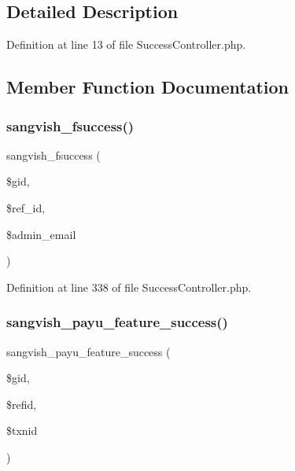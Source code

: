\subsection{Detailed Description}


Definition at line 13 of file Success\+Controller.\+php.



\subsection{Member Function Documentation}
\mbox{\label{class_responsive_1_1_http_1_1_controllers_1_1_success_controller_ae3ec1a40ba04486b8b8ef25720c97e68}} 
\subsubsection{\texorpdfstring{sangvish\_fsuccess()}{sangvish\_fsuccess()}}
{\footnotesize\ttfamily sangvish\+\_\+fsuccess (\begin{DoxyParamCaption}\item[{}]{\$gid,  }\item[{}]{\$ref\+\_\+id,  }\item[{}]{\$admin\+\_\+email }\end{DoxyParamCaption})}



Definition at line 338 of file Success\+Controller.\+php.

\mbox{\label{class_responsive_1_1_http_1_1_controllers_1_1_success_controller_a58b7405d84a9ab321d38338e2a424977}} 
\subsubsection{\texorpdfstring{sangvish\_payu\_feature\_success()}{sangvish\_payu\_feature\_success()}}
{\footnotesize\ttfamily sangvish\+\_\+payu\+\_\+feature\+\_\+success (\begin{DoxyParamCaption}\item[{}]{\$gid,  }\item[{}]{\$refid,  }\item[{}]{\$txnid }\end{DoxyParamCaption})}



